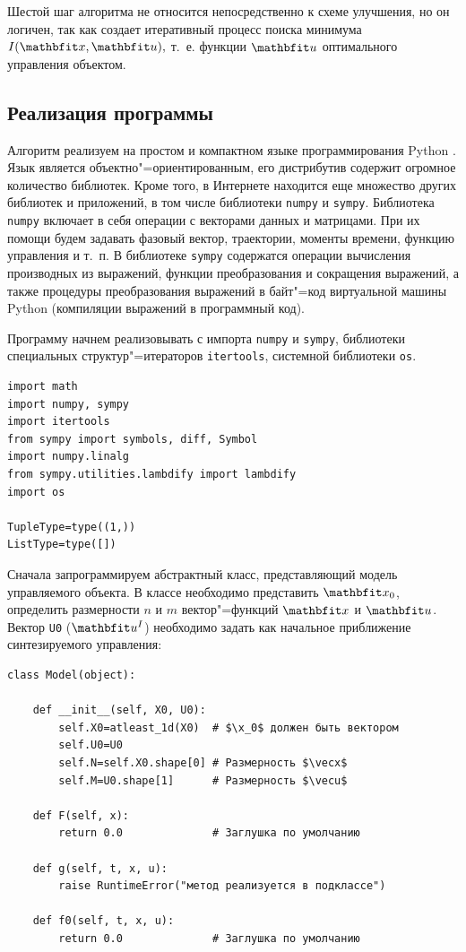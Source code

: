 \documentclass[a4paper,14pt, openany, twoside, final]{extbook} %
\begin{document}
Шестой шаг алгоритма не относится непосредственно к схеме улучшения, но он логичен, так как создает итеративный процесс поиска минимума $I(\x,\u),$ т.~е. функции $\vecu$ оптимального  управления объектом.

\subsection{Реализация программы}
\label{sec:improprog}

Алгоритм реализуем на простом и компактном языке программирования Python \cite{pythondl,pythondoc,pythonbook}.  Язык является объектно"=ориентированным, его дистрибутив содержит огромное количество библиотек.  Кроме того, в Интернете находится еще множество других библиотек и приложений, в том числе библиотеки \texttt{numpy} и \texttt{sympy}.  Библиотека \texttt{numpy} включает в себя операции с векторами данных и матрицами.  При их помощи будем задавать фазовый вектор, траектории, моменты времени, функцию управления и т.~п.  В библиотеке \texttt{sympy} содержатся операции вычисления производных из выражений, функции преобразования и сокращения выражений, а также процедуры преобразования выражений в байт"=код виртуальной машины Python (компиляции выражений в программный код).

Программу начнем реализовывать с импорта \texttt{numpy} и \texttt{sympy}, библиотеки специальных структур"=итераторов \texttt{itertools}, системной библиотеки \texttt{os}.
\begin{verbatim}
import math
import numpy, sympy
import itertools
from sympy import symbols, diff, Symbol
import numpy.linalg
from sympy.utilities.lambdify import lambdify
import os

TupleType=type((1,))
ListType=type([])
\end{verbatim}

Сначала запрограммируем абстрактный класс, представляющий модель управляемого объекта.  В классе необходимо представить $\x_0$, определить размерности $n$ и $m$ вектор"=функций $\x$ и $\u$.  Вектор \texttt{U0} ($\u^{I}$) необходимо задать как начальное приближение синтезируемого управления:

\begin{verbatim}
class Model(object):

    def __init__(self, X0, U0):
        self.X0=atleast_1d(X0)  # $\x_0$ должен быть вектором
        self.U0=U0
        self.N=self.X0.shape[0] # Размерность $\vecx$
        self.M=U0.shape[1]      # Размерность $\vecu$

    def F(self, x):
        return 0.0              # Заглушка по умолчанию

    def g(self, t, x, u):
        raise RuntimeError("метод реализуется в подклассе")

    def f0(self, t, x, u):
        return 0.0              # Заглушка по умолчанию
\end{verbatim}
\end{document}
